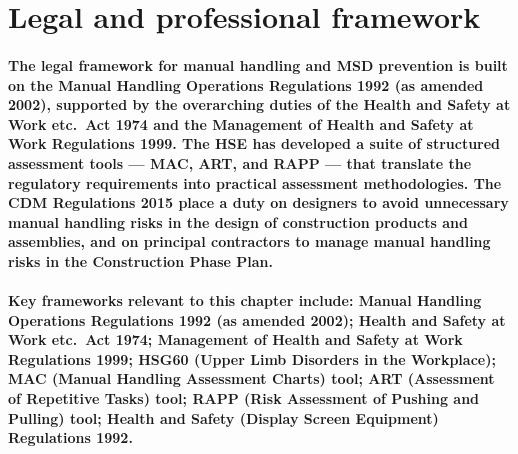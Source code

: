 
\section{Legal and professional framework}

\paragraph{The legal framework for manual handling and MSD prevention is built on the Manual Handling Operations Regulations 1992 (as amended 2002), supported by the overarching duties of the Health and Safety at Work etc.\ Act 1974 and the Management of Health and Safety at Work Regulations 1999. The HSE has developed a suite of structured assessment tools --- MAC, ART, and RAPP --- that translate the regulatory requirements into practical assessment methodologies. The CDM Regulations 2015 place a duty on designers to avoid unnecessary manual handling risks in the design of construction products and assemblies, and on principal contractors to manage manual handling risks in the Construction Phase Plan.}

\paragraph{Key frameworks relevant to this chapter include: Manual Handling Operations Regulations 1992 (as amended 2002); Health and Safety at Work etc.\ Act 1974; Management of Health and Safety at Work Regulations 1999; HSG60 (Upper Limb Disorders in the Workplace); MAC (Manual Handling Assessment Charts) tool; ART (Assessment of Repetitive Tasks) tool; RAPP (Risk Assessment of Pushing and Pulling) tool; Health and Safety (Display Screen Equipment) Regulations 1992.}


